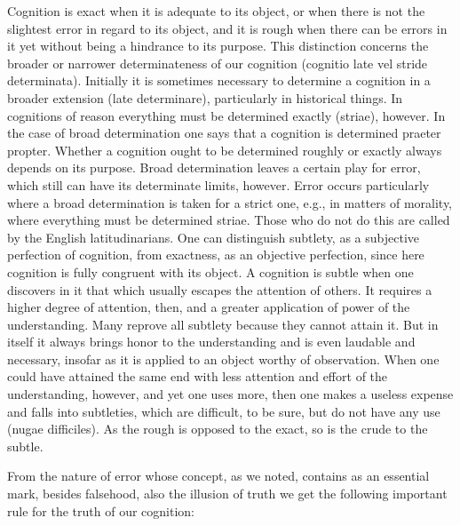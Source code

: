         Cognition is exact when it is adequate to its object, or
        when there is not the slightest error in regard to its object,
        and it is rough when there can be errors in it yet
        without being a hindrance to its purpose.
        This distinction concerns the broader or narrower determinateness
        of our cognition (cognitio late vel stride determinata).
        Initially it is sometimes necessary to determine a cognition
        in a broader extension (late determinare),
        particularly in historical things.
        In cognitions of reason everything must be
        determined exactly (striae), however.
        In the case of broad determination
        one says that a cognition is determined praeter propter.
        Whether a cognition ought to be determined roughly or exactly
        always depends on its purpose.
        Broad determination leaves a certain play for error,
        which still can have its determinate limits, however.
        Error occurs particularly where a broad determination is taken for a strict one,
        e.g., in matters of morality, where everything must be determined striae.
        Those who do not do this are called by the English latitudinarians.
        One can distinguish subtlety, as a subjective perfection of cognition,
        from exactness, as an objective perfection, since here cognition is
        fully congruent with its object.
        A cognition is subtle when one discovers in it that which usually escapes
        the attention of others. It requires a higher degree of attention, then, and
        a greater application of power of the understanding.
        Many reprove all subtlety because they cannot attain it.
        But in itself it always brings honor to the understanding and
        is even laudable and necessary, insofar as it is applied to an object worthy of observation.
        When one could have attained the same end with less attention and
        effort of the understanding, however, and yet one uses more,
        then one makes a useless expense and falls into subtleties,
        which are difficult, to be sure, but do not have any use (nugae difficiles).
        As the rough is opposed to the exact, so is the crude to the subtle.

    From the nature of error whose concept, as we noted,
    contains as an essential mark, besides falsehood,
    also the illusion of truth
    we get the following important rule
    for the truth of our cognition:

